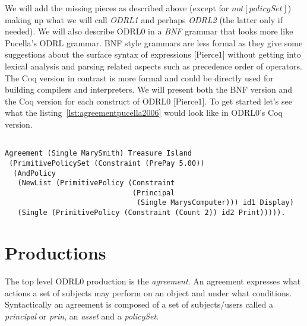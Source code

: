 We will add the missing pieces as described above (except for $not[policySet]$) making up what we will call \emph{ODRL1} and perhaps \emph{ODRL2} (the latter only if needed). We will also describe ODRL0 in a \emph{BNF} grammar that looks more like Pucella's ODRL grammar. BNF style grammars are less formal as they give some suggestions about the surface syntax of expressions [Pierce1] without getting into lexical analysis and parsing related aspects such as precedence order of operators. The Coq version in contrast is more formal and could be directly used for building compilers and interpreters. We will present both the BNF version and the Coq version for each construct of ODRL0 [Pierce1]. To get started let's see what the listing~\ref{lst:agreementpucella2006} would look like in ODRL0's Coq version.

\lstset{language=Coq}
\begin{lstlisting}[frame=single, caption={Coq version of agreement for Mary Smith},label={lst:marysmithagreementcoq}]

Agreement (Single MarySmith) Treasure Island 
 (PrimitivePolicySet (Constraint (PrePay 5.00))
  (AndPolicy 
   (NewList (PrimitivePolicy (Constraint 
                              (Principal 
                               (Single MarysComputer))) id1 Display)
   (Single (PrimitivePolicy (Constraint (Count 2)) id2 Print))))).
\end{lstlisting}



\section{Productions} \label{sec:productionast}

The top level ODRL0 production is the \emph{agreement}. An agreement expresses what actions a set of subjects may perform on an object and under what conditions. Syntactically an agreement is composed of a set of subjects/users called a \emph{principal} or \emph{prin}, an \emph{asset} and a \emph{policySet}.

